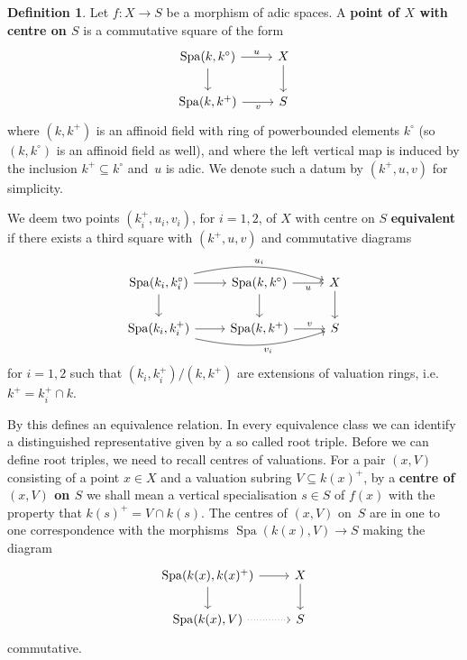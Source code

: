 \documentclass[a4paper,twoside,11pt,reqno]{amsart}
\DeclareMathOperator{\Spa}{Spa}
\theoremstyle{definition}
\newtheorem{defi}[thm]{Definition}
\numberwithin{equation}{subsection}
\begin{document}
\begin{defi}
    Let $f\colon X\to S$ be a morphism of adic spaces. A \textbf{point of $X$ with centre on $S$} is a commutative square of the form
    \begin{equation} \label{eqn:pp-test-square} 
        \begin{tikzcd}
            \Spa(k, k^\circ) \ar[r,"u"] \ar[d] & X \ar[d] \\
            \Spa(k, k^+) \ar[r,"v",swap] & S
        \end{tikzcd}
    \end{equation}
    where $(k, k^+)$ is an affinoid field with ring of powerbounded elements $k^\circ$ (so $(k, k^\circ)$ is an affinoid field as well), and where the left vertical map is induced by the inclusion $k^+\subseteq k^\circ$ and~$u$ is adic. We denote such a datum by $(k^+, u, v)$ for simplicity. 

    We deem two points $(k_i^+, u_i, v_i)$, for $i=1,2$, of $X$ with centre on $S$ \textbf{equivalent} if there exists a third square with $(k^+, u, v)$ and commutative diagrams
    \[ 
        \begin{tikzcd}
            \Spa(k_i, k^\circ_i) \ar[r] \ar[d] \ar[rr,"u_i",bend left=15] & \Spa(k, k^\circ) \ar[r,"u",swap] \ar[d] & X \ar[d]  \\
            \Spa(k_i, k^+_i) \ar[r] \ar[rr,"v_i",swap,bend right=15] & \Spa(k, k^+)\ar[r,"v"] & S
        \end{tikzcd}
    \]
    for $i=1,2$ such that $(k_i,k_i^+)/(k,k^+)$ are extensions of valuation rings, i.e.\ $k^+=k_i^+\cap k$.
\end{defi}

By \cite[Lemma~4.3]{Solodov-vertical-compactification} this defines an equivalence relation.
In every equivalence class we can identify a distinguished representative given by a so called root triple.
Before we can define root triples, we need to recall centres of valuations.
For a pair $(x, V)$ consisting of a point $x\in X$ and a valuation subring $V\subseteq k(x)^+$, by a {\bf centre of $(x, V)$ on $S$} we shall mean a vertical specialisation $s\in S$ of $f(x)$ with the property that $k(s)^+ = V\cap k(s)$.
The centres of $(x,V)$ on~$S$ are in one to one correspondence with the morphisms $\Spa(k(x),V) \to S$ making the diagram
\[
 \begin{tikzcd}
     \Spa(k(x),k(x)^+)  \ar[r]  \ar[d]  & X \ar[d]  \\
     \Spa(k(x),V)       \ar[r,dotted]          & S
 \end{tikzcd}
\]
commutative.
\end{document}
